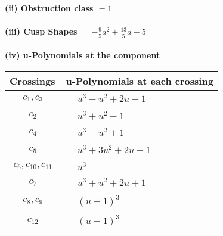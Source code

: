 \documentclass[1p]{elsarticle_modified}
\theoremstyle{definition}
\begin{document}
\flushleft \textbf{(ii) Obstruction class $= 1$}\\~\\
\flushleft \textbf{(iii) Cusp Shapes $= -\frac{9}{5} a^2+\frac{13}{5} a-5$}\\~\\
\newpage\renewcommand{\arraystretch}{1}
\flushleft \textbf{(iv) u-Polynomials at the component}\newline \\
\begin{tabular}{m{50pt}|m{274pt}}
Crossings & \hspace{64pt}u-Polynomials at each crossing \\
\hline $$\begin{aligned}c_{1},c_{3}\end{aligned}$$&$\begin{aligned}
&u^3- u^2+2 u-1
\end{aligned}$\\
\hline $$\begin{aligned}c_{2}\end{aligned}$$&$\begin{aligned}
&u^3+u^2-1
\end{aligned}$\\
\hline $$\begin{aligned}c_{4}\end{aligned}$$&$\begin{aligned}
&u^3- u^2+1
\end{aligned}$\\
\hline $$\begin{aligned}c_{5}\end{aligned}$$&$\begin{aligned}
&u^3+3 u^2+2 u-1
\end{aligned}$\\
\hline $$\begin{aligned}c_{6},c_{10},c_{11}\end{aligned}$$&$\begin{aligned}
&u^3
\end{aligned}$\\
\hline $$\begin{aligned}c_{7}\end{aligned}$$&$\begin{aligned}
&u^3+u^2+2 u+1
\end{aligned}$\\
\hline $$\begin{aligned}c_{8},c_{9}\end{aligned}$$&$\begin{aligned}
&(u+1)^3
\end{aligned}$\\
\hline $$\begin{aligned}c_{12}\end{aligned}$$&$\begin{aligned}
&(u-1)^3
\end{aligned}$\\
\hline
\end{tabular}\\~\\
\end{document}
